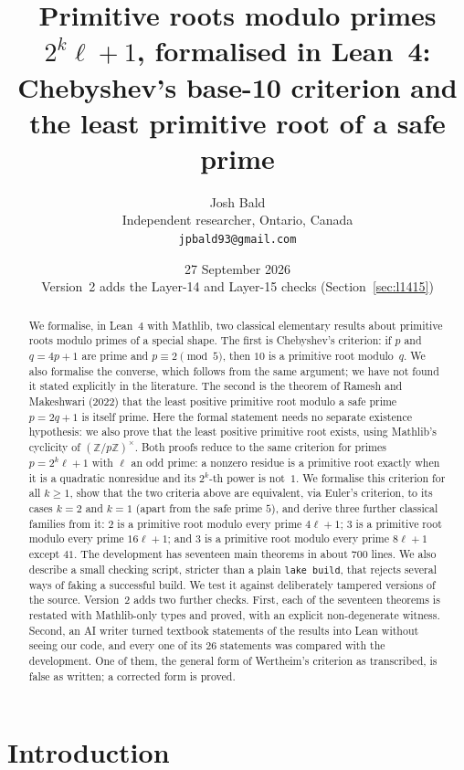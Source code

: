 \documentclass[11pt]{article}
\title{Primitive roots modulo primes $2^k\ell+1$, formalised in Lean~4:\\
Chebyshev's base-10 criterion and the least primitive root of a safe prime}
\author{Josh Bald\\ \small Independent researcher, Ontario, Canada\\ \small\texttt{jpbald93@gmail.com}}
\date{27 September 2026\\ \small Version~2 adds the Layer-14 and Layer-15 checks (Section~\ref{sec:l1415})}
\theoremstyle{remark}
\begin{document}
\maketitle

\begin{abstract}
We formalise, in Lean~4 with Mathlib, two classical elementary results about primitive roots
modulo primes of a special shape. The first is Chebyshev's criterion: if $p$ and $q=4p+1$ are
prime and $p\equiv 2\pmod 5$, then $10$ is a primitive root modulo~$q$. We also formalise the
converse, which follows from the same argument; we have not found it stated explicitly in the
literature. The second is the theorem of Ramesh and Makeshwari (2022) that the least positive
primitive root modulo a safe prime $p=2q+1$ is itself prime. Here the formal statement needs no separate existence hypothesis: we also prove that the least positive primitive root exists, using Mathlib's
cyclicity of $(\mathbb{Z}/p\mathbb{Z})^\times$. Both proofs reduce to the same criterion for primes $p=2^k\ell+1$ with $\ell$ an odd prime: a
nonzero residue is a primitive root exactly when it is a quadratic nonresidue and its $2^k$-th power
is not~$1$. We formalise this criterion for all $k\geq 1$, show that the two criteria above are equivalent, via
Euler's criterion, to its cases $k=2$ and $k=1$ (apart from the safe prime $5$), and derive three further classical families from it: $2$ is a primitive root
modulo every prime $4\ell+1$; $3$ is a primitive root modulo every prime $16\ell+1$; and $3$ is a
primitive root modulo every prime $8\ell+1$ except $41$. The development has seventeen main
theorems in about 700 lines. We
also describe a small checking script, stricter than a plain \texttt{lake build}, that rejects
several ways of faking a successful build. We test it against deliberately tampered versions of
the source. Version~2 adds two further checks. First, each of the seventeen theorems is restated with
Mathlib-only types and proved, with an explicit non-degenerate witness. Second, an AI writer
turned textbook statements of the results into Lean without seeing our code, and every one of its 26
statements was compared with the development. One of them, the general form of Wertheim's criterion as
transcribed, is false as written; a corrected form is proved.
\end{abstract}

\section{Introduction}
\end{document}
